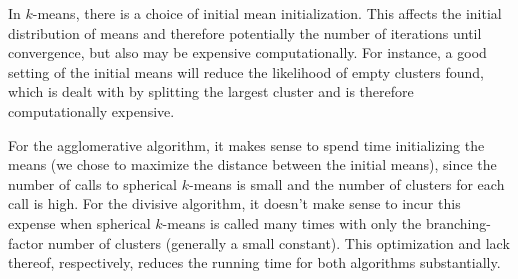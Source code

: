 \documentclass[../tech_report_1.tex]{subfiles}
\begin{document}
In $k$-means, there is a choice of initial mean initialization. This affects the initial distribution of means and therefore potentially the number of iterations until convergence, but also may be expensive computationally. For instance, a good setting of the initial means will reduce the likelihood of empty clusters found, which is dealt with by splitting the largest cluster and is therefore computationally expensive.

For the agglomerative algorithm, it makes sense to spend time initializing the means (we chose to maximize the distance between the initial means), since the number of calls to spherical $k$-means is small and the number of clusters for each call is high. For the divisive algorithm, it doesn't make sense to incur this expense when spherical $k$-means is called many times with only the branching-factor number of clusters (generally a small constant). This optimization and lack thereof, respectively, reduces the running time for both algorithms substantially.
\end{document}
